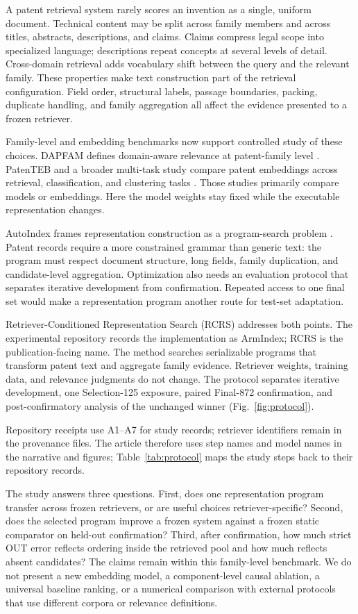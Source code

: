 \documentclass[final,5p,times,twocolumn]{elsarticle}
\newcommand{\RCRS}{RCRS}
\begin{document}
A patent retrieval system rarely scores an invention as a single, uniform
document. Technical content may be split across family members and across
titles, abstracts, descriptions, and claims. Claims compress legal scope into
specialized language; descriptions repeat concepts at several levels of
detail. Cross-domain retrieval adds vocabulary shift between the query and the
relevant family. These properties make text construction part of the retrieval
configuration. Field order, structural labels, passage boundaries, packing,
duplicate handling, and family aggregation all affect the evidence presented
to a frozen retriever.

Family-level and embedding benchmarks now support controlled study of these
choices. DAPFAM defines domain-aware relevance at patent-family level
\cite{dapfam2026}. PatenTEB and a broader multi-task study compare patent
embeddings across retrieval, classification, and clustering tasks
\cite{patenteb2025,patentembeddings2026}. Those studies primarily compare
models or embeddings. Here the model weights stay fixed while the executable
representation changes.

AutoIndex frames representation construction as a program-search problem
\cite{autoindex2026}. Patent records require a more constrained grammar than
generic text: the program must respect document structure, long fields,
family duplication, and candidate-level aggregation. Optimization also needs
an evaluation protocol that separates iterative development from confirmation.
Repeated access to one final set would make a representation program another
route for test-set adaptation.

Retriever-Conditioned Representation Search (\RCRS{}) addresses both points.
The experimental repository records the implementation as ArmIndex; \RCRS{}
is the publication-facing name. The method searches serializable
programs that transform patent text and aggregate family evidence. Retriever
weights, training data, and relevance judgments do not change. The protocol
separates iterative development, one Selection-125 exposure, paired Final-872
confirmation, and post-confirmatory analysis of the unchanged winner
(Fig.~\ref{fig:protocol}).

Repository receipts use A1--A7 for study records; retriever identifiers remain
in the provenance files. The article therefore uses step names and model names
in the narrative and figures; Table~\ref{tab:protocol} maps the study steps back
to their repository records.

\pagebreak
The study answers three questions. First, does one representation program
transfer across frozen retrievers, or are useful choices retriever-specific?
Second, does the selected program improve a frozen system against a frozen
static comparator on held-out confirmation? Third, after confirmation, how
much strict OUT error reflects ordering inside the retrieved pool and how much
reflects absent candidates? The claims remain within this family-level
benchmark. We do not present a new embedding model, a component-level causal
ablation, a universal baseline ranking, or a numerical comparison with
external protocols that use different corpora or relevance definitions.
\end{document}
